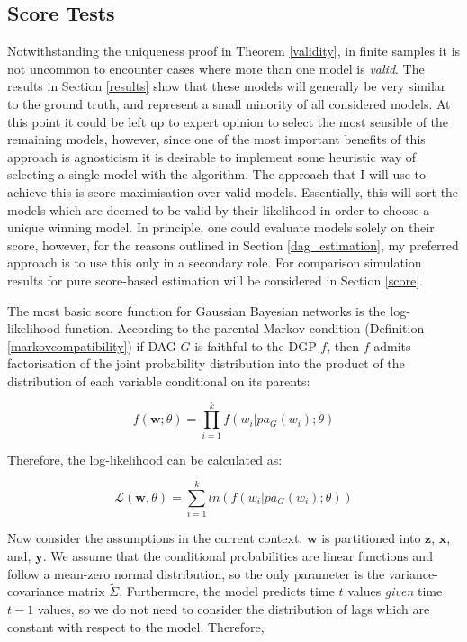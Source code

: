 \documentclass{article}
\begin{document}
\subsection{Score Tests} \label{scoretests}

Notwithstanding the uniqueness proof in Theorem \ref{validity}, in finite samples it is not uncommon to encounter cases where more than one model is \textit{valid}. The results in Section \ref{results} show that these models will generally be very similar to the ground truth, and represent a small minority of all considered models. At this point it could be left up to expert opinion to select the most sensible of the remaining models, however, since one of the most important benefits of this approach is agnosticism it is desirable to implement some heuristic way of selecting a single model with the algorithm. The approach that I will use to achieve this is score maximisation over valid models. Essentially, this will sort the models which are deemed to be valid by their likelihood in order to choose a unique winning model. In principle, one could evaluate models solely on their score, however, for the reasons outlined in Section \ref{dag_estimation}, my preferred approach is to use this only in a secondary role. For comparison simulation results for pure score-based estimation will be considered in Section \ref{score}.

The most basic score function for Gaussian Bayesian networks is the log-likelihood function. According to the parental Markov condition (Definition \ref{markovcompatibility}) if DAG $G$ is faithful to the DGP $f$, then $f$ admits factorisation of the joint probability distribution into the product of the distribution of each variable conditional on its parents:

\begin{equation}
  f(\mathbf{w};\theta) = \prod_{i=1}^{k} f(w_i | pa_G(w_i);\theta)
\end{equation}

Therefore, the log-likelihood can be calculated as:

\begin{equation}
  \mathcal{L}(\mathbf{w},\theta) = \sum_{i=1}^{k} ln(f(w_i | pa_G(w_i);\theta))
\end{equation}

Now consider the assumptions in the current context. $\mathbf{w}$ is partitioned into $\mathbf{z}$, $\mathbf{x}$, and, $\mathbf{y}$. We assume that the conditional probabilities are linear functions and follow a mean-zero normal distribution, so the only parameter is the variance-covariance matrix $\tilde{\Sigma}$. Furthermore, the model predicts time $t$ values \textit{given} time $t-1$ values, so we do not need to consider the distribution of lags which are constant with respect to the model. Therefore,
\end{document}
